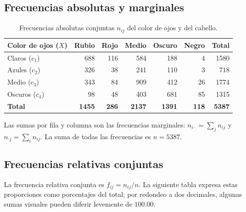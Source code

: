 \subsection{Frecuencias absolutas y marginales}

\begin{table}[H]
\centering
\small
\setlength{\tabcolsep}{5pt}
\renewcommand{\arraystretch}{1.15}
\begin{tabular}{|l|r|r|r|r|r|r|}
\hline
\textbf{Color de ojos ($X$)} & \textbf{Rubio} & \textbf{Rojo} & \textbf{Medio} & \textbf{Oscuro} & \textbf{Negro} & \textbf{Total} \\ \hline
Claros ($c_1$)  & 688 & 116 & 584 & 188 & 4  & 1580 \\ \hline
Azules ($c_2$)  & 326 & 38  & 241 & 110 & 3  & 718 \\ \hline
Medio ($c_3$)   & 343 & 84  & 909 & 412 & 26 & 1774 \\ \hline
Oscuros ($c_4$) & 98  & 48  & 403 & 681 & 85 & 1315 \\ \hline
\textbf{Total} & \textbf{1455} & \textbf{286} & \textbf{2137} & \textbf{1391} & \textbf{118} & \textbf{5387} \\ \hline
\end{tabular}
\caption{Frecuencias absolutas conjuntas $n_{ij}$ del color de ojos y del cabello.}
\label{tab:ojos-cabello-absolutas}
\end{table}

Las sumas por fila y columna son las frecuencias marginales: $n_{i\cdot}=\sum_j n_{ij}$ y $n_{\cdot j}=\sum_i n_{ij}$. La suma de todas las frecuencias es $n=5387$.

\subsection{Frecuencias relativas conjuntas}

La frecuencia relativa conjunta es $f_{ij}=n_{ij}/n$. La siguiente tabla expresa estas proporciones como porcentajes del total; por redondeo a dos decimales, algunas sumas visuales pueden diferir levemente de $100.00$.

